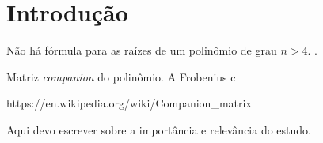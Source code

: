 \chapter{Introdução}
\label{cap:introducao}

\setcounter{page}{12}

Não há fórmula para as raízes de um polinômio de grau $n > 4$. \cite{Pan97}.

Matriz \emph{companion} do polinômio. A Frobenius c

https://en.wikipedia.org/wiki/Companion\_matrix

Aqui devo escrever sobre a importância e relevância do estudo. 